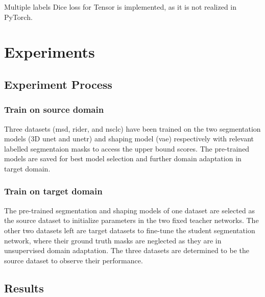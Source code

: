 \documentclass[11pt,times,oneside,openright]{eeereport}
\begin{document}
Multiple labels Dice loss for Tensor is implemented, as it is not realized in PyTorch.



\chapter{Experiments}

\section{Experiment Process}

\subsection{Train on source domain}
Three datasets (\acrshort{msd}, \acrshort{rider}, and \acrshort{nsclc}) have been trained on the two segmentation models (3D \acrshort{unet} and \acrshort{unetr}) and shaping model (\acrshort{vae}) respectively with relevant labelled segmentaion masks to access the upper bound scores. The pre-trained models are saved for best model selection and further domain adaptation in target domain.
\subsection{Train on target domain}
The pre-trained segmentation and shaping models of one dataset are selected as the source dataset to initialize parameters in the two fixed teacher networks. The other two datasets left are target datasets to fine-tune the student segmentation network, where their ground truth masks are neglected as they are in unsupervised domain adaptation. The three datasets are determined to be the source dataset to observe their performance.

\section{Results}

\end{document}
